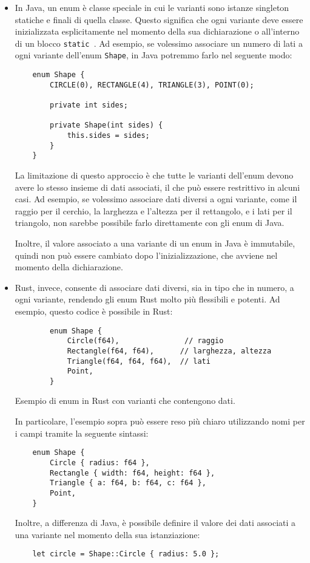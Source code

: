 \begin{itemize}
    \item In Java, un enum è classe speciale in cui le varianti sono istanze singleton statiche e finali di quella classe. Questo significa che ogni variante deve essere inizializzata esplicitamente nel momento della sua dichiarazione o all'interno di un blocco \texttt{static {}}. Ad esempio, se volessimo associare un numero di lati a ogni variante dell'enum \texttt{Shape}, in Java potremmo farlo nel seguente modo:
\begin{verbatim}
    enum Shape {
        CIRCLE(0), RECTANGLE(4), TRIANGLE(3), POINT(0);

        private int sides;

        private Shape(int sides) {
            this.sides = sides;
        }
    }
\end{verbatim}
    La limitazione di questo approccio è che tutte le varianti dell'enum devono avere lo stesso insieme di dati associati, il che può essere restrittivo in alcuni casi. Ad esempio, se volessimo associare dati diversi a ogni variante, come il raggio per il cerchio, la larghezza e l'altezza per il rettangolo, e i lati per il triangolo, non sarebbe possibile farlo direttamente con gli enum di Java.

    Inoltre, il valore associato a una variante di un enum in Java è immutabile, quindi non può essere cambiato dopo l'inizializzazione, che avviene nel momento della dichiarazione.
    \item Rust, invece, consente di associare dati diversi, sia in tipo che in numero, a ogni variante, rendendo gli enum Rust molto più flessibili e potenti. Ad esempio, questo codice è possibile in Rust:
\begin{listing}[H]
    \begin{verbatim}
        enum Shape {
            Circle(f64),               // raggio
            Rectangle(f64, f64),      // larghezza, altezza
            Triangle(f64, f64, f64),  // lati
            Point,  
        }
    \end{verbatim}
    \caption{Esempio di enum in Rust con varianti che contengono dati.}
    \label{lst:enum_example}
\end{listing}
    In particolare, l'esempio sopra può essere reso più chiaro utilizzando nomi per i campi tramite la seguente sintassi:
\begin{verbatim}
    enum Shape {
        Circle { radius: f64 },
        Rectangle { width: f64, height: f64 },
        Triangle { a: f64, b: f64, c: f64 },
        Point,  
    }
\end{verbatim}
Inoltre, a differenza di Java, è possibile definire il valore dei dati associati a una variante nel momento della sua istanziazione:
\begin{verbatim}
    let circle = Shape::Circle { radius: 5.0 };
\end{verbatim}
\end{itemize}  
